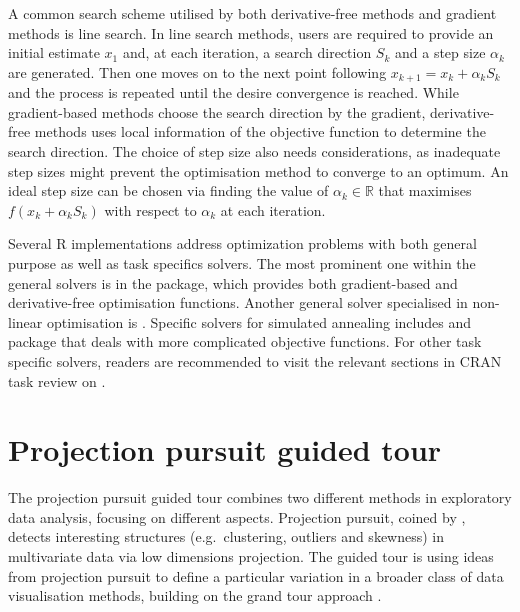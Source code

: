 A common search scheme utilised by both derivative-free methods and
gradient methods is line search. In line search methods, users are
required to provide an initial estimate \(x_{1}\) and, at each
iteration, a search direction \(S_k\) and a step size \(\alpha_k\) are
generated. Then one moves on to the next point following
\(x_{k+1} = x_k + \alpha_kS_k\) and the process is repeated until the
desire convergence is reached. While gradient-based methods choose the
search direction by the gradient, derivative-free methods uses local
information of the objective function to determine the search direction.
The choice of step size also needs considerations, as inadequate step
sizes might prevent the optimisation method to converge to an optimum.
An ideal step size can be chosen via finding the value of
\(\alpha_k \in \mathbb{R}\) that maximises \(f(x_k + \alpha_kS_k)\) with
respect to \(\alpha_k\) at each iteration.

Several R implementations address optimization problems with both
general purpose as well as task specifics solvers. The most prominent
one within the general solvers is  in the 
\citep{stats} package, which provides both gradient-based and
derivative-free optimisation functions. Another general solver
specialised in non-linear optimisation is 
\citep{nloptr}. Specific solvers for simulated annealing includes
 and package 
\citep{gensa} that deals with more complicated objective functions. For
other task specific solvers, readers are recommended to visit the
relevant sections in CRAN task review on
\citep{crantaskreviewoptim}.

\hypertarget{tour}{%
\section{Projection pursuit guided tour}\label{tour}}

The projection pursuit guided tour combines two different methods in
exploratory data analysis, focusing on different aspects. Projection
pursuit, coined by \citet{friedman1974projection}, detects interesting
structures (e.g.~clustering, outliers and skewness) in multivariate data
via low dimensions projection. The guided tour is using ideas from
projection pursuit to define a particular variation in a broader class
of data visualisation methods, building on the grand tour approach
\citep{As85}.

